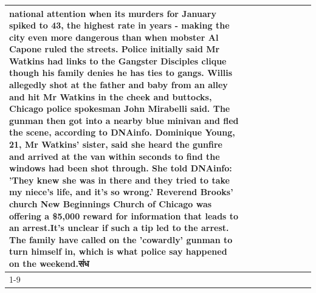\begin{table}[H]
\begin{tabular}{lllrlllll}
national attention when its murders for January spiked to 43, the highest rate in years - making the city even more dangerous than when mobster Al Capone ruled the streets. Police initially said Mr Watkins had links to the Gangster Disciples clique though his family denies he has ties to gangs. Willis allegedly shot at the father and baby from an alley and hit Mr Watkins in the cheek and buttocks, Chicago police spokesman John Mirabelli said. The gunman then got into a nearby blue minivan and fled the scene, according to DNAinfo. Dominique Young, 21, Mr Watkins' sister, said she heard the gunfire and arrived at the van within seconds to find the windows had been shot through. She told DNAinfo: 'They knew she was in there and they tried to take my niece's life, and it's so wrong.' Reverend Brooks' church New Beginnings Church of Chicago was offering a \$5,000 reward for information that leads to an arrest.It's unclear if such a tip led to the arrest. The family have called on the 'cowardly' gunman to turn himself in, which is what police say happened on the weekend.संध \\
\cline{1-9}

\end{tabular}
\end{table}
